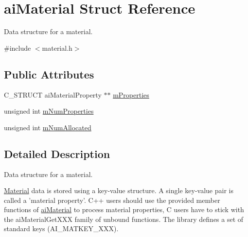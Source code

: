 \hypertarget{structai_material}{\section{ai\-Material Struct Reference}
\label{structai_material}
}


Data structure for a material.  




{\ttfamily \#include $<$material.\-h$>$}

\subsection*{Public Attributes}
\begin{DoxyCompactItemize}
\item 
C\-\_\-\-S\-T\-R\-U\-C\-T ai\-Material\-Property $\ast$$\ast$ \hyperlink{structai_material_af32b125d54bff5bc1fc54a1007487cab}{m\-Properties}
\item 
unsigned int \hyperlink{structai_material_a243b07afdc6507f8878c93a2cafe4963}{m\-Num\-Properties}
\item 
unsigned int \hyperlink{structai_material_a84a0016a263362c52b27a9d8d76dc449}{m\-Num\-Allocated}
\end{DoxyCompactItemize}


\subsection{Detailed Description}
Data structure for a material. 

\hyperlink{class_material}{Material} data is stored using a key-\/value structure. A single key-\/value pair is called a 'material property'. C++ users should use the provided member functions of \hyperlink{structai_material}{ai\-Material} to process material properties, C users have to stick with the ai\-Material\-Get\-X\-X\-X family of unbound functions. The library defines a set of standard keys (A\-I\-\_\-\-M\-A\-T\-K\-E\-Y\-\_\-\-X\-X\-X). 

